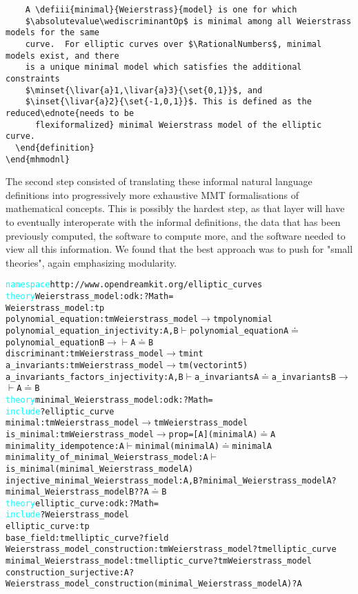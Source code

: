 \begin{verbatim}
    A \defiii{minimal}{Weierstrass}{model} is one for which
    $\absolutevalue\wediscriminantOp$ is minimal among all Weierstrass models for the same
    curve.  For elliptic curves over $\RationalNumbers$, minimal models exist, and there
    is a unique minimal model which satisfies the additional constraints
    $\minset{\livar{a}1,\livar{a}3}{\set{0,1}}$, and
    $\inset{\livar{a}2}{\set{-1,0,1}}$. This is defined as the reduced\ednote{needs to be
      flexiformalized} minimal Weierstrass model of the elliptic curve.
  \end{definition}
\end{mhmodnl}
\end{verbatim}

The second step consisted of translating these informal natural language definitions into progressively more exhaustive MMT formalisations of mathematical concepts. This is possibly the hardest step, as that layer will have to eventually interoperate with the informal \stex definitions, the data that has been previously computed, the software to compute more, and the software needed to view all this information. We found that the best approach was to push for "small theories", again emphasizing modularity. 









\begin{alltt}
\textcolor{cyan}{namespace} http://www.opendreamkit.org/elliptic_curves \RS
\textcolor{cyan}{theory} Weierstrass_model : odk:?Math = 
  Weierstrass_model : tp \RS
  polynomial_equation : tm Weierstrass_model \(\rightarrow\) tm polynomial \RS
  polynomial_equation_injectivity : {A, B} \(\vdash\) polynomial_equation A \(\doteq\)  polynomial_equation B \(\rightarrow\) \(\vdash\) A \(\doteq\)  B \RS
  discriminant : tm Weierstrass_model \(\rightarrow\) tm int \RS
  a_invariants : tm Weierstrass_model \(\rightarrow\) tm (vector int 5) \RS
  a_invariants_factors_injectivity : {A,B} \(\vdash\) a_invariants A \(\doteq\) a_invariants B \(\rightarrow\)\(\vdash\) A \(\doteq\) B \RS
\GS
\textcolor{cyan}{theory} minimal_Weierstrass_model : odk:?Math =
  \textcolor{cyan}{include} ?elliptic_curve \RS
  minimal : tm Weierstrass_model  \(\rightarrow\)  tm Weierstrass_model \RS
  is_minimal : tm Weierstrass_model  \(\rightarrow\)  prop \US = [A] (minimal A) \(\doteq\) A \RS
  minimality_idempotence : {A} \(\vdash\) minimal (minimal A) \(\doteq\) minimal A \RS
  minimality_of_minimal_Weierstrass_model : {A} \(\vdash\) is_minimal (minimal_Weierstrass_model A)  \RS
  injective_minimal_Weierstrass_model : {A,B} ? minimal_Weierstrass_model A ? minimal_Weierstrass_model B ? ? A \(\doteq\) B  \RS
\GS
\textcolor{cyan}{theory} elliptic_curve : odk:?Math = 
  \textcolor{cyan}{include} ?Weierstrass_model  \RS
  elliptic_curve : tp  \RS
  base_field : tm elliptic_curve ? field \RS
  Weierstrass_model_construction : tm Weierstrass_model ? tm elliptic_curve \RS
  minimal_Weierstrass_model : tm elliptic_curve ? tm Weierstrass_model \RS
  construction_surjective: {A} ? Weierstrass_model_construction (minimal_Weierstrass_model A) ? A  \RS
\GS
\end{alltt}


